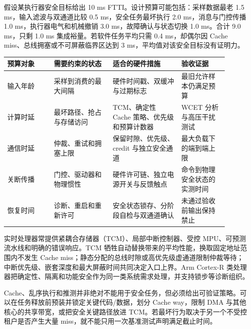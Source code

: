 假设某执行器安全目标给出 10 ms FTTI。设计预算可能包括：采样数据最老 1.5 ms，输入滤波与双通道比较 0.5 ms，安全任务最坏执行 2.0 ms，消息与门控传播 1.0 ms，执行器电气和机械撤销 3.0 ms，故障确认与状态切换 1.0 ms。合计 9.0 ms，只剩 1.0 ms 集成裕量。若软件任务平均只需 0.4 ms，却偶尔因 Cache miss、总线拥塞或不可屏蔽临界区达到 3 ms，平均值对该安全目标没有证明力。

\begin{longtable}{L{0.19\linewidth}L{0.24\linewidth}L{0.28\linewidth}L{0.19\linewidth}}
\toprule
预算对象 & 需要约束的状态 & 适合的硬件措施 & 验收证据 \\
\midrule
输入年龄 & 采样到消费的最大间隔 & 硬件时间戳、双缓冲与过期标志 & 最旧允许样本仍满足预算 \\\tablerowrule
计算时延 & 最坏路径、抢占与存储访问 & TCM、确定性 Cache 策略、优先级和预算计数器 & WCET 分析与高压干扰测试 \\\tablerowrule
通信时延 & 仲裁、重试和拥塞上限 & 保留时隙、优先级、credit 与独立安全通道 & 最大负载下的端到端上限 \\\tablerowrule
关断传播 & 门控、驱动器和物理惯性 & 硬件许可链、独立电源开关与反馈触点 & 命令到物理安全状态的实测时间 \\\tablerowrule
恢复时间 & 诊断、重启和重新许可 & 安全状态锁存、分阶段自检与双通道确认 & 未通过验收前输出保持禁止 \\
\bottomrule
\end{longtable}


实时处理器常提供紧耦合存储器（TCM）、局部中断控制器、受控 MPU、可预测流水线和明确的错误响应。TCM 牺牲自动替换带来的平均性能，换取固定地址范围内不发生 Cache miss；静态分配的总线时隙或高优先级虚通道限制仲裁等待；中断优先级、嵌套深度和最大屏蔽时间共同决定入口上界。Arm Cortex-R 类处理器把确定性、隔离和功能安全作为同一类系统需求处理，并支持锁步等诊断组织。\cite{arm-lockstep-safety}

Cache、乱序执行和推测并非绝对不能用于安全任务，但必须给出可验证策略。可以在任务释放前预装并锁定关键代码/数据，划分 Cache way，限制 DMA 与其他核心的共享带宽，或把安全关键路径放进 TCM。若最坏行为取决于另一个不受控租户是否产生大量 miss，就不能只用一次基准测试声明满足截止时间。


